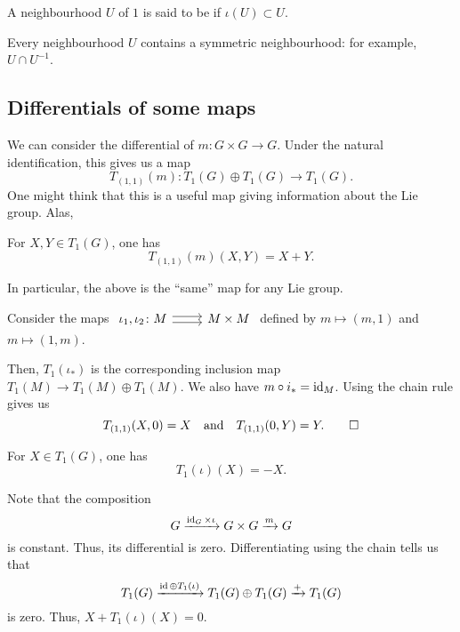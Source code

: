 \documentclass[12pt]{article}
\begin{document}
\begin{defn}
	A neighbourhood $U$ of $1$ is said to be  if $\iota(U) \subset U$.
\end{defn}
Every neighbourhood $U$ contains a symmetric neighbourhood: for example, $U \cap U^{-1}$.

\subsection{Differentials of some maps}

We can consider the differential of $m \colon G \times G \to G$. 
Under the natural identification, this gives us a map
\begin{equation*} 
	T_{(1, 1)}(m) \colon T_{1}(G) \oplus T_{1}(G) \to T_{1}(G).
\end{equation*}
One might think that this is a useful map giving information about the Lie group. Alas,
\begin{thm}
	For $X, Y \in T_{1}(G)$, one has
	\begin{equation*} 
		T_{(1, 1)}(m)(X, Y) = X + Y.
	\end{equation*}
\end{thm}
In particular, the above is the ``same'' map for any Lie group.
\begin{sketch}
	Consider the maps $\begin{tikzcd} \iota_{1}, \iota_{2} \colon M \arrow[r, shift left] \arrow[r, shift right] & M \times M \end{tikzcd}$ defined by $m \mapsto (m, 1)$ and $m \mapsto (1, m)$. 

	Then, $T_{1}(\iota_{\ast})$ is the corresponding inclusion map $T_{1}(M) \to T_{1}(M) \oplus T_{1}(M)$. 
	We also have $m \circ i_{\ast} = \operatorname{id}_{M}$. \newline
	Using the chain rule gives us
	\begin{equation*} 
		T_{(1, 1)}(X, 0) = X \quad\text{and}\quad T_{(1, 1)}(0, Y) = Y. \qedhere
	\end{equation*}
\end{sketch}

\begin{thm}
	For $X \in T_{1}(G)$, one has
	\begin{equation*} 
		T_{1}(\iota)(X) = -X.
	\end{equation*}
\end{thm}
\begin{sketch}
	Note that the composition
	\begin{equation*} 
		G \xrightarrow{\operatorname{id}_{G} \times \iota} G \times G \xrightarrow{m} G
	\end{equation*}
	is constant. Thus, its differential is zero. 
	Differentiating using the chain tells us that
	\begin{equation*} 
		T_{1}(G) \xrightarrow{\operatorname{id} \oplus T_{1}(\iota)} T_{1}(G) \oplus T_{1}(G) \xrightarrow{+} T_{1}(G)
	\end{equation*}
	is zero. Thus, $X + T_{1}(\iota)(X) = 0$.
\end{sketch}
\end{document}

